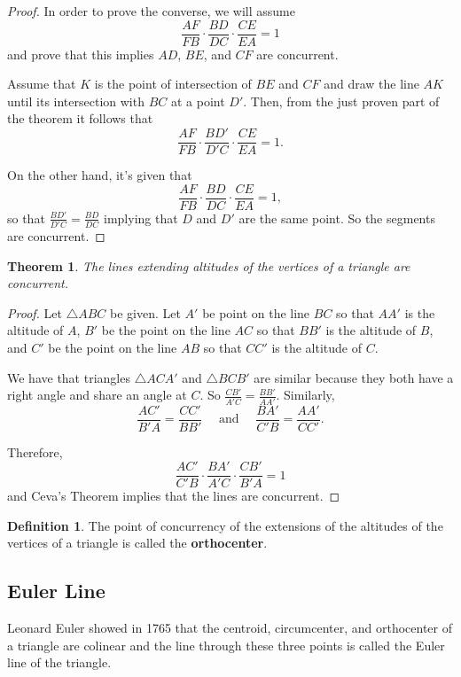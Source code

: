 \documentclass[
]{book}
\newtheorem{theorem}{Theorem}[chapter]
\theoremstyle{definition}
\newtheorem{definition}{Definition}[chapter]
\theoremstyle{definition}
\theoremstyle{definition}
\theoremstyle{definition}
\theoremstyle{remark}
\begin{document}
\begin{proof}
In order to prove the converse, we will assume \[\frac{AF}{FB} \cdot \frac{BD}{DC} \cdot \frac{CE}{EA} = 1\] and prove that this implies \(AD\), \(BE\), and \(CF\) are concurrent.

Assume that \(K\) is the point of intersection of \(BE\) and \(CF\) and draw the line \(AK\) until its intersection with \(BC\) at a point \(D'\). Then, from the just proven part of the theorem it follows that \[\frac{AF}{FB} \cdot \frac{BD'}{D'C} \cdot \frac{CE}{EA} = 1.\]

On the other hand, it's given that \[\frac{AF}{FB} \cdot \frac{BD}{DC} \cdot \frac{CE}{EA} = 1,\]
so that \(\frac{BD'}{D'C} = \frac{BD}{DC}\) implying that \(D\) and \(D'\) are the same point. So the segments are concurrent.
\end{proof}

\begin{theorem}
The lines extending altitudes of the vertices of a triangle are concurrent.
\end{theorem}

\begin{proof}
Let \(\triangle ABC\) be given. Let \(A'\) be point on the line \(BC\) so that \(AA'\) is the altitude of \(A\), \(B'\) be the point on the line \(AC\) so that \(BB'\) is the altitude of \(B\), and \(C'\) be the point on the line \(AB\) so that \(CC'\) is the altitude of \(C\).

We have that triangles \(\triangle ACA'\) and \(\triangle BCB'\) are similar because they both have a right angle and share an angle at \(C\). So \(\frac{CB'}{A'C}=\frac{BB'}{AA'}\). Similarly, \[\frac{AC'}{B'A} = \frac{CC'}{BB'} \quad \mbox{ and } \quad \frac{BA'}{C'B}=\frac{AA'}{CC'}.\]

Therefore, \[\frac{AC'}{C'B} \cdot \frac{BA'}{A'C} \cdot \frac{CB'}{B'A} = 1\] and Ceva's Theorem implies that the lines are concurrent.
\end{proof}

\begin{definition}
The point of concurrency of the extensions of the altitudes of the vertices of a triangle is called the \textbf{orthocenter}.
\end{definition}

\hypertarget{euler-line}{%
\subsection{Euler Line}\label{euler-line}}

Leonard Euler showed in 1765 that the centroid, circumcenter, and orthocenter of a triangle are colinear and the line through these three points is called the Euler line of the triangle.
\end{document}

